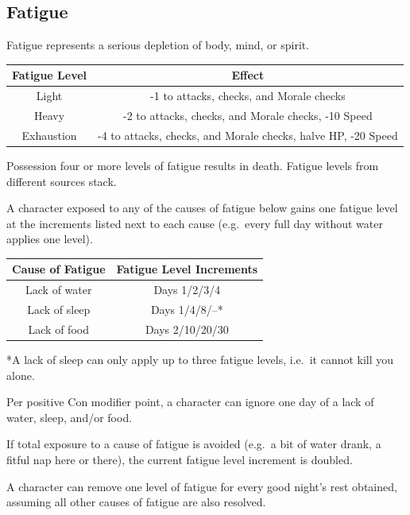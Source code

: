 \documentclass{book}
\begin{document}
\subsection*{Fatigue}\label{fatigue}

Fatigue represents a serious depletion of body, mind, or spirit.


\begin{table}[h]
	\centering
	\begin{tabular}{cc}
		\toprule
			Fatigue Level & Effect \\
		\midrule
			Light & -1 to attacks, checks, and Morale checks \\
			Heavy & -2 to attacks, checks, and Morale checks, -10 Speed \\
			Exhaustion & -4 to attacks, checks, and Morale checks, halve HP, -20
			Speed \\
			\bottomrule
	\end{tabular}
\end{table}

Possession four or more levels of fatigue results in death. Fatigue levels from different sources stack.

A character exposed to any of the causes of fatigue below gains one
fatigue level at the increments listed next to each cause (e.g.~every
full day without water applies one level).

\begin{longtable}[]{@{}cc@{}}
\toprule\noalign{}
Cause of Fatigue & Fatigue Level Increments \\
\midrule\noalign{}
\endhead
\bottomrule\noalign{}
\endlastfoot
Lack of water & Days 1/2/3/4 \\
Lack of sleep & Days 1/4/8/--* \\
Lack of food & Days 2/10/20/30 \\
\end{longtable}

*A lack of sleep can only apply up to three fatigue levels, i.e.~it
cannot kill you alone.

Per positive Con modifier point, a character can ignore one day of a
lack of water, sleep, and/or food.

If total exposure to a cause of fatigue is avoided (e.g.~a bit of water
drank, a fitful nap here or there), the current fatigue level increment
is doubled.

A character can remove one level of fatigue for every good night's rest
obtained, assuming all other causes of fatigue are also resolved.
\end{document}
